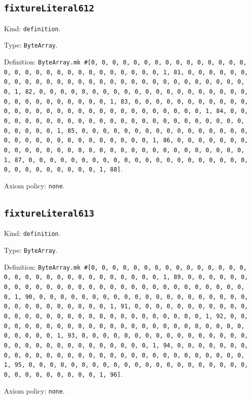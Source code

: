 \documentclass[11pt]{article}
\begin{document}
\subsection*{\texttt{fixtureLiteral612}}
\noindent Kind: \texttt{definition}.\par
\noindent Type: \texttt{ByteArray}.\par
\noindent Definition: \texttt{ByteArray.mk \#[0, 0, 0, 0, 0, 0, 0, 0, 0, 0, 0, 0, 0, 0, 0, 0, 0, 0, 0, 0, 0, 0, 0, 0, 0, 0, 0, 0, 0, 0, 1, 81, 0, 0, 0, 0, 0, 0, 0, 0, 0, 0, 0, 0, 0, 0, 0, 0, 0, 0, 0, 0, 0, 0, 0, 0, 0, 0, 0, 0, 0, 0, 1, 82, 0, 0, 0, 0, 0, 0, 0, 0, 0, 0, 0, 0, 0, 0, 0, 0, 0, 0, 0, 0, 0, 0, 0, 0, 0, 0, 0, 0, 0, 0, 1, 83, 0, 0, 0, 0, 0, 0, 0, 0, 0, 0, 0, 0, 0, 0, 0, 0, 0, 0, 0, 0, 0, 0, 0, 0, 0, 0, 0, 0, 0, 0, 1, 84, 0, 0, 0, 0, 0, 0, 0, 0, 0, 0, 0, 0, 0, 0, 0, 0, 0, 0, 0, 0, 0, 0, 0, 0, 0, 0, 0, 0, 0, 0, 1, 85, 0, 0, 0, 0, 0, 0, 0, 0, 0, 0, 0, 0, 0, 0, 0, 0, 0, 0, 0, 0, 0, 0, 0, 0, 0, 0, 0, 0, 0, 0, 1, 86, 0, 0, 0, 0, 0, 0, 0, 0, 0, 0, 0, 0, 0, 0, 0, 0, 0, 0, 0, 0, 0, 0, 0, 0, 0, 0, 0, 0, 0, 0, 1, 87, 0, 0, 0, 0, 0, 0, 0, 0, 0, 0, 0, 0, 0, 0, 0, 0, 0, 0, 0, 0, 0, 0, 0, 0, 0, 0, 0, 0, 0, 0, 1, 88]}.\par
\noindent Axiom policy: \texttt{none}.\par
\subsection*{\texttt{fixtureLiteral613}}
\noindent Kind: \texttt{definition}.\par
\noindent Type: \texttt{ByteArray}.\par
\noindent Definition: \texttt{ByteArray.mk \#[0, 0, 0, 0, 0, 0, 0, 0, 0, 0, 0, 0, 0, 0, 0, 0, 0, 0, 0, 0, 0, 0, 0, 0, 0, 0, 0, 0, 0, 0, 1, 89, 0, 0, 0, 0, 0, 0, 0, 0, 0, 0, 0, 0, 0, 0, 0, 0, 0, 0, 0, 0, 0, 0, 0, 0, 0, 0, 0, 0, 0, 0, 1, 90, 0, 0, 0, 0, 0, 0, 0, 0, 0, 0, 0, 0, 0, 0, 0, 0, 0, 0, 0, 0, 0, 0, 0, 0, 0, 0, 0, 0, 0, 0, 1, 91, 0, 0, 0, 0, 0, 0, 0, 0, 0, 0, 0, 0, 0, 0, 0, 0, 0, 0, 0, 0, 0, 0, 0, 0, 0, 0, 0, 0, 0, 0, 1, 92, 0, 0, 0, 0, 0, 0, 0, 0, 0, 0, 0, 0, 0, 0, 0, 0, 0, 0, 0, 0, 0, 0, 0, 0, 0, 0, 0, 0, 0, 0, 1, 93, 0, 0, 0, 0, 0, 0, 0, 0, 0, 0, 0, 0, 0, 0, 0, 0, 0, 0, 0, 0, 0, 0, 0, 0, 0, 0, 0, 0, 0, 0, 1, 94, 0, 0, 0, 0, 0, 0, 0, 0, 0, 0, 0, 0, 0, 0, 0, 0, 0, 0, 0, 0, 0, 0, 0, 0, 0, 0, 0, 0, 0, 0, 1, 95, 0, 0, 0, 0, 0, 0, 0, 0, 0, 0, 0, 0, 0, 0, 0, 0, 0, 0, 0, 0, 0, 0, 0, 0, 0, 0, 0, 0, 0, 0, 1, 96]}.\par
\noindent Axiom policy: \texttt{none}.\par
\end{document}
